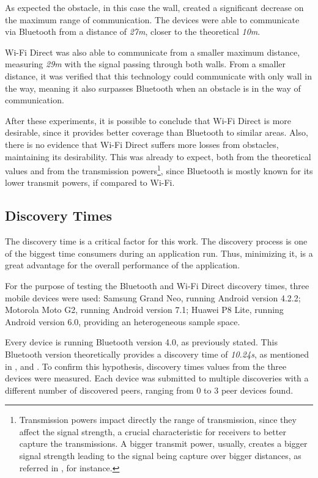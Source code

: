 As expected the obstacle, in this case the wall, created a significant decrease on the maximum range of communication. The devices were able to communicate via Bluetooth from a distance of \textit{27m}, closer to the theoretical \textit{10m}.

Wi-Fi Direct was also able to communicate from a smaller maximum distance, measuring \textit{29m} with the signal passing through both walls. From a smaller distance, it was verified that this technology could communicate with only wall in the way, meaning it also surpasses Bluetooth when an obstacle is in the way of communication.

After these experiments, it is possible to conclude that Wi-Fi Direct is more desirable, since it provides better coverage than Bluetooth to similar areas. Also, there is no evidence that Wi-Fi Direct suffers more losses from obstacles, maintaining its desirability. This was already to expect, both from the theoretical values and from the transmission powers\footnote{Transmission powers impact directly the range of transmission, since they affect the signal strength, a crucial characteristic for receivers to better capture the transmissions. A bigger transmit power, usually, creates a bigger signal strength leading to the signal being capture over bigger distances, as referred in \cite{txpower}, for instance.}, since Bluetooth is mostly known for its lower transmit powers, if compared to Wi-Fi.

\subsection{Discovery Times}
\label{subsec:normaldisc}

The discovery time is a critical factor for this work. The discovery process is one of the biggest time consumers during an application run. Thus, minimizing it, is a great advantage for the overall performance of the application.

For the purpose of testing the Bluetooth and Wi-Fi Direct discovery times, three mobile devices were used: Samsung Grand Neo, running Android version 4.2.2; Motorola Moto G2, running Android version 7.1; Huawei P8 Lite, running Android version 6.0, providing an heterogeneous sample space.

Every device is running Bluetooth version 4.0, as previously stated. This Bluetooth version theoretically provides a discovery time of \textit{10.24s}, as mentioned in \cite{bluetoothspec}, \cite{btdisc1} and \cite{btdisc2}. To confirm this hypothesis, discovery times values from the three devices were measured. Each device was submitted to multiple discoveries with a different number of discovered peers, ranging from 0 to 3 peer devices found.

